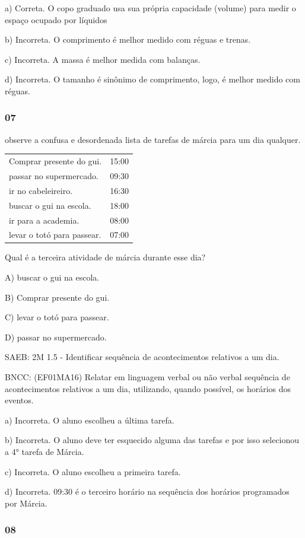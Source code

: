 a) Correta. O copo graduado usa sua própria capacidade (volume) para
medir o espaço ocupado por líquidos

b) Incorreta. O comprimento é melhor medido com réguas e trenas.

c) Incorreta. A massa é melhor medida com balanças.

d) Incorreta. O tamanho é sinônimo de comprimento, logo, é melhor medido
com réguas.

\subsubsection{07}\label{section-93}

observe a confusa e desordenada lista de tarefas de márcia para um dia
qualquer.

\begin{longtable}[]{@{}ll@{}}
\toprule
Comprar presente do gui. & 15:00\tabularnewline
passar no supermercado. & 09:30\tabularnewline
ir no cabeleireiro. & 16:30\tabularnewline
buscar o gui na escola. & 18:00\tabularnewline
ir para a academia. & 08:00\tabularnewline
levar o totó para passear. & 07:00\tabularnewline
\bottomrule
\end{longtable}

Qual é a terceira atividade de márcia durante esse dia?

A) buscar o gui na escola.

B) Comprar presente do gui.

C) levar o totó para passear.

D) passar no supermercado.

SAEB: 2M 1.5 - Identificar sequência de acontecimentos relativos a um
dia.

BNCC: (EF01MA16) Relatar em linguagem verbal ou não verbal sequência de
acontecimentos relativos a um dia, utilizando, quando possível, os
horários dos eventos.

a) Incorreta. O aluno escolheu a última tarefa.

b) Incorreta. O aluno deve ter esquecido alguma das tarefas e por isso
selecionou a 4° tarefa de Márcia.

c) Incorreta. O aluno escolheu a primeira tarefa.

d) Incorreta. 09:30 é o terceiro horário na sequência dos horários
programados por Márcia.

\subsubsection{08}\label{section-94}

